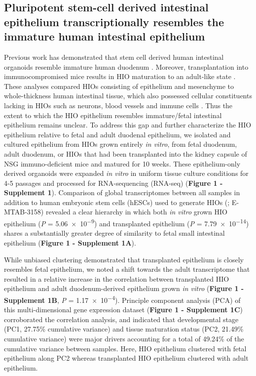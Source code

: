 \documentclass[9pt,lineo]{elife}
\begin{document}
\subsection*{{\bfseries\sffamily } Pluripotent stem-cell derived intestinal epithelium transcriptionally resembles the immature human intestinal epithelium}
\label{sec:orgheadline2}
Previous work has demonstrated that stem cell derived human intestinal organoids resemble immature human duodenum \citep{Watson:2014,Finkbeiner:2015,Tsai:2017}. Moreover, transplantation into immunocompromised mice results in HIO maturation to an adult-like state \citep{Watson:2014,Finkbeiner:2015}. These analyses compared HIOs consisting of epithelium and mesenchyme to whole-thickness human intestinal tissue, which also possessed cellular constituents lacking in HIOs such as neurons, blood vessels and immune cells  \citep{Finkbeiner:2015}. Thus the extent to which the HIO epithelium resembles immature/fetal intestinal epithelium remains unclear. To address this gap and further characterize the HIO epithelium relative to fetal and adult duodenal epithelium, we isolated and cultured epithelium from HIOs grown entirely \emph{in vitro}, from fetal duodenum, adult duodenum, or HIOs that had been transplanted into the kidney capsule of NSG immuno-deficient mice and matured for 10 weeks. These epithelium-only derived organoids were expanded \emph{in vitro} in uniform tissue culture conditions for 4-5 passages and processed for RNA-sequencing (RNA-seq) (\textbf{Figure 1 - Supplement 1}). Comparison of global transcriptomes between all samples in addition to human embryonic stem cells (hESCs) used to generate HIOs (\citealt{Finkbeiner:2015}; E-MTAB-3158) revealed a clear hierarchy in which both \emph{in vitro} grown HIO epithelium (\emph{P} = \num{5.06e-9}) and transplanted epithelium (\emph{P} = \num{7.79e-14}) shares a substantially greater degree of similarity to fetal small intestinal epithelium (\textbf{Figure 1 - Supplement 1A}). 

While unbiased clustering demonstrated that transplanted epithelium is closely resembles fetal epithelium, we noted a shift towards the adult transcriptome that resulted in a relative increase in the correlation between transplanted HIO epithelium and adult duodenum-derived epithelium grown \emph{in vitro}  (\textbf{Figure 1 - Supplement 1B}, \emph{P} = \num{1.17e-4}). Principle component analysis (PCA) of this multi-dimensional gene expression dataset (\textbf{Figure 1 - Supplement 1C}) corroborated the correlation analysis, and indicated that developmental stage  (PC1, 27.75\% cumulative variance) and tissue maturation status (PC2, 21.49\% cumulative variance) were major drivers accounting for a total of 49.24\% of the cumulative variance between samples. Here, HIO epithelium clustered with fetal epithelium along PC2 whereas transplanted HIO epithelium clustered with adult epithelium.
\end{document}
